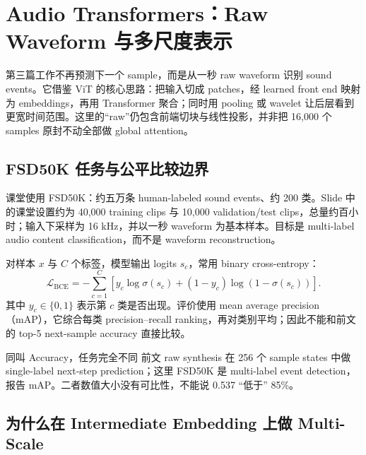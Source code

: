 \section{Audio Transformers：Raw Waveform 与多尺度表示}

第三篇工作不再预测下一个 sample，而是从一秒 raw waveform 识别 sound events。它借鉴 ViT 的核心思路：把输入切成 patches，经 learned front end 映射为 embeddings，再用 Transformer 聚合；同时用 pooling 或 wavelet 让后层看到更宽时间范围。这里的“raw”仍包含前端切块与线性投影，并非把 16,000 个 samples 原封不动全部做 global attention。


\subsection{FSD50K 任务与公平比较边界}

课堂使用 FSD50K：约五万条 human-labeled sound events、约 200 类。Slide 中的课堂设置约为 40,000 training clips 与 10,000 validation/test clips，总量约百小时；输入下采样为 16 kHz，并以一秒 waveform 为基本样本。目标是 multi-label audio content classification，而不是 waveform reconstruction。


对样本 $x$ 与 $C$ 个标签，模型输出 logits $s_c$，常用 binary cross-entropy：
\[
\mathcal{L}_{\mathrm{BCE}}
=-\sum_{c=1}^{C}
\left[y_c\log\sigma(s_c)+(1-y_c)\log(1-\sigma(s_c))\right].
\]
其中 $y_c\in\{0,1\}$ 表示第 $c$ 类是否出现。评价使用 mean average precision（mAP），它综合每类 precision--recall ranking，再对类别平均；因此不能和前文的 top-5 next-sample accuracy 直接比较。

\begin{warningbox}{同叫 Accuracy，任务完全不同}
前文 raw synthesis 在 256 个 sample states 中做 single-label next-step prediction；这里 FSD50K 是 multi-label event detection，报告 mAP。二者数值大小没有可比性，不能说 0.537 “低于” 85\%。
\end{warningbox}

\subsection{为什么在 Intermediate Embedding 上做 Multi-Scale}

